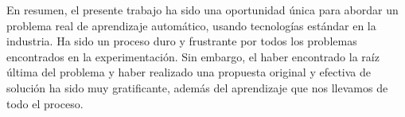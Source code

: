 En resumen, el presente trabajo ha sido una oportunidad única para abordar un problema real de aprendizaje automático, usando tecnologías estándar en la industria. Ha sido un proceso duro y frustrante por todos los problemas encontrados en la experimentación. Sin embargo, el haber encontrado la raíz última del problema y haber realizado una propuesta original y efectiva de solución ha sido muy gratificante, además del aprendizaje que nos llevamos de todo el proceso.
